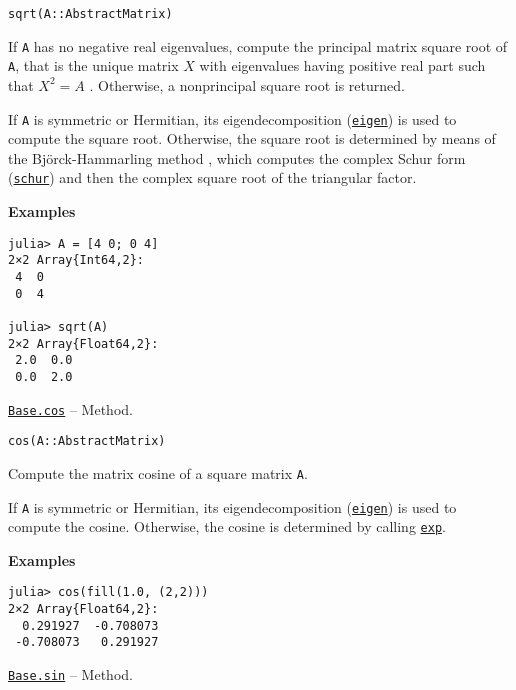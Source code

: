 \begin{adjustwidth}{2em}{0pt}


\begin{verbatim}
sqrt(A::AbstractMatrix)
\end{verbatim}

If \texttt{A} has no negative real eigenvalues, compute the principal matrix square root of \texttt{A}, that is the unique matrix  \(X\)  with eigenvalues having positive real part such that  \(X^2 = A\) . Otherwise, a nonprincipal square root is returned.

If \texttt{A} is symmetric or Hermitian, its eigendecomposition (\hyperlink{11056016707394839114}{\texttt{eigen}}) is used to compute the square root. Otherwise, the square root is determined by means of the Björck-Hammarling method \footnotemark[11], which computes the complex Schur form (\hyperlink{17132870828407138368}{\texttt{schur}}) and then the complex square root of the triangular factor.

\textbf{Examples}


\begin{verbatim}
julia> A = [4 0; 0 4]
2×2 Array{Int64,2}:
 4  0
 0  4

julia> sqrt(A)
2×2 Array{Float64,2}:
 2.0  0.0
 0.0  2.0
\end{verbatim}



\end{adjustwidth}
\hypertarget{11601410820050169124}{} 
\hyperlink{11601410820050169124}{\texttt{Base.cos}}  -- {Method.}

\begin{adjustwidth}{2em}{0pt}


\begin{verbatim}
cos(A::AbstractMatrix)
\end{verbatim}

Compute the matrix cosine of a square matrix \texttt{A}.

If \texttt{A} is symmetric or Hermitian, its eigendecomposition (\hyperlink{11056016707394839114}{\texttt{eigen}}) is used to compute the cosine. Otherwise, the cosine is determined by calling \hyperlink{5801729597955756107}{\texttt{exp}}.

\textbf{Examples}


\begin{verbatim}
julia> cos(fill(1.0, (2,2)))
2×2 Array{Float64,2}:
  0.291927  -0.708073
 -0.708073   0.291927
\end{verbatim}



\end{adjustwidth}
\hypertarget{14039855138661767630}{} 
\hyperlink{14039855138661767630}{\texttt{Base.sin}}  -- {Method.}

